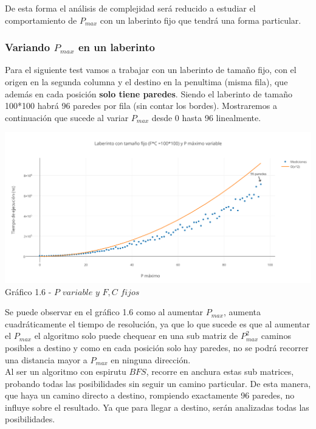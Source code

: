 De esta forma el análisis de complejidad será reducido a estudiar el comportamiento de $P_{max}$ con un laberinto fijo que tendrá una forma particular.

\subsubsection*{Variando $P_{max}$ en un laberinto}

Para el siguiente test vamos a trabajar con un laberinto de tamaño fijo, con el origen en la segunda columna y el destino en la penultima (misma fila), que además en cada posición \textbf{solo tiene paredes}. Siendo el laberinto de tamaño 100*100 habrá 96 paredes por fila (sin contar los bordes).
Mostraremos a continuaci\'on que sucede al variar $P_{max}$ desde 0 hasta 96 linealmente.\\

\vspace*{0.3cm} \vspace*{0.3cm}
  \begin{center}
\includegraphics[scale=0.65]{./EJ1/pVariableBfs.png}
{Gr\'afico 1.6 - $P$ $variable$ $y$ $F,C$ $fijos$}
  \end{center}
  \vspace*{0.3cm}

Se puede observar en el gr\'afico 1.6 como al aumentar $P_{max}$, aumenta cuadráticamente el tiempo de resoluci\'on, ya que lo que sucede es que al aumentar el $P_{max}$ el algoritmo solo puede chequear en una sub matriz de $P_{max}^2$ caminos posibles a destino y como en cada posición solo hay paredes, no se podrá recorrer una distancia mayor a $P_{max}$ en ninguna dirección.\\
Al ser un algoritmo con espirutu $BFS$, recorre en anchura estas sub matrices, probando todas las posibilidades sin seguir un camino particular. De esta manera, que haya un camino directo a destino, rompiendo exactamente 96 paredes, no influye sobre el resultado. Ya que para llegar a destino, serán analizadas todas las posibilidades. 

